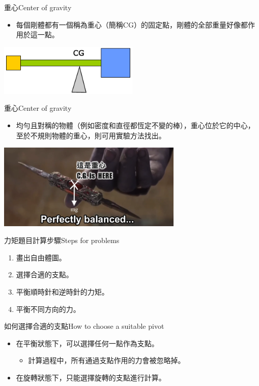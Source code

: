 \documentclass[beamer=true]{standalone}
\begin{document}
\begin{frame}{重心Center of gravity}
    \begin{itemize}
        \item 每個剛體都有一個稱為重心（簡稱CG）的固定點，剛體的全部重量好像都作用於這一點。
    \end{itemize}\bigskip
    {\par\centering
        \includegraphics[width=0.5\textwidth]{assets/ad409000.png}
        \par}
\end{frame}
\begin{frame}{重心Center of gravity}
    \begin{itemize}
        \item 均勻且對稱的物體（例如密度和直徑都恆定不變的棒），重心位於它的中心，至於不規則物體的重心，則可用實驗方法找出。
    \end{itemize}\bigskip
    {\par\centering
        \includegraphics[width=0.66\textwidth]{assets/0610c65e.png}
        \par}
\end{frame}


\begin{frame}{力矩題目計算步驟Steps for problems}
    \begin{enumerate}
        \item 畫出自由體圖。
        \item 選擇合適的支點。
        \item 平衡順時針和逆時針的力矩。
        \item 平衡不同方向的力。
    \end{enumerate}
\end{frame}
\begin{frame}{如何選擇合適的支點How to choose a suitable pivot}
    \begin{itemize}
        \item 在平衡狀態下，可以選擇任何一點作為支點。
              \begin{itemize}
                  \item 計算過程中，所有通過支點作用的力會被忽略掉。
              \end{itemize}
        \item 在旋轉狀態下，只能選擇旋轉的支點進行計算。
    \end{itemize}
\end{frame}
\end{document}

